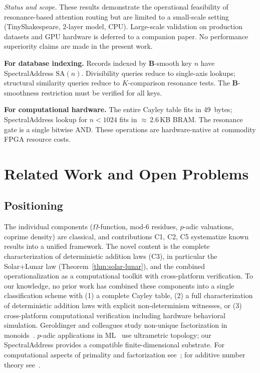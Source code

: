 \documentclass[10pt,twocolumn]{article}
\newcommand{\SA}{\mathrm{SA}}
\newcommand{\Om}{\Omega}
\newcommand{\B}{\mathbf{B}}
\begin{document}
\noindent\emph{Status and scope.} These results demonstrate the
operational feasibility of resonance-based attention routing but are
limited to a small-scale setting (TinyShakespeare, 2-layer model, CPU).
Large-scale validation on production datasets and GPU hardware is
deferred to a companion paper. No performance superiority claims are
made in the present work.

\textbf{For database indexing.} Records indexed by $\B$-smooth key $n$
have SpectralAddress $\SA(n)$. Divisibility queries reduce to single-axis
lookups; structural similarity queries reduce to $K$-comparison resonance
tests. The $\B$-smoothness restriction must be verified for all keys.

\textbf{For computational hardware.} The entire Cayley table fits in
49~bytes; SpectralAddress lookup for $n < 1024$ fits in ${\approx}\,2.6$\,KB BRAM.
The resonance gate is a single bitwise AND. These operations are
hardware-native at commodity FPGA resource costs.

\section{Related Work and Open Problems}\label{sec:relwork}

\subsection{Positioning}

The individual components ($\Om$-function, mod-6 residues, $p$-adic
valuations, coprime density) are classical, and contributions C1, C2, C5
systematize known results into a unified framework.
The novel content is the complete characterization of deterministic
addition laws (C3), in particular the Solar+Lunar law
(Theorem~\ref{thm:solar-lunar}), and the combined operationalization as
a computational toolkit with cross-platform verification.
To our knowledge, no prior work has combined these components into a
single classification scheme with (1) a complete Cayley table, (2) a
full characterization of deterministic addition laws with explicit
non-determinism witnesses, or (3) cross-platform computational
verification including hardware behavioral simulation. Geroldinger and colleagues study
non-unique factorization in monoids~\cite{GeroldingerHalterKoch2006}.
$p$-adic applications in ML~\cite{ZunigaGalindo2023} use ultrametric
topology; our SpectralAddress provides a compatible finite-dimensional
substrate. For computational aspects of primality and factorization
see~\cite{CrandallPomerance2005}; for additive number theory
see~\cite{Nathanson1996}.
\end{document}
